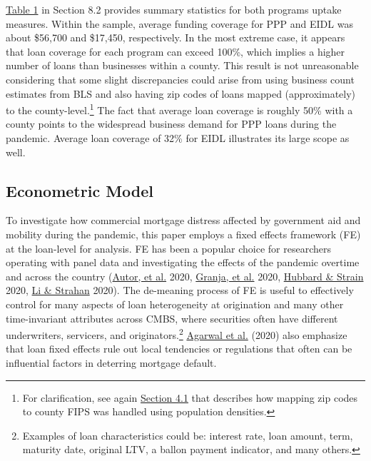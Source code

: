 \documentclass[11pt]{article} %
\begin{document}
\hyperlink{Summary Statistics}{Table 1} in Section 8.2 provides summary statistics for both programs uptake measures. Within the sample, average funding coverage for PPP and EIDL was about \$56,700 and \$17,450, respectively. In the most extreme case, it appears that loan coverage for each program can exceed 100\%, which implies a higher number of loans than businesses within a county. This result is not unreasonable considering that some slight discrepancies could arise from using business count estimates from BLS and also having zip codes of loans mapped (approximately) to the county-level.\footnote{For clarification, see again \hyperlink{Commercial Mortgage Performance}{Section 4.1} that describes how mapping zip codes to county FIPS was handled using population densities.} The fact that average loan coverage is roughly 50\% with a county points to the widespread business demand for PPP loans during the pandemic. Average loan coverage of 32\% for EIDL illustrates its large scope as well.  

\subsection{Econometric Model}
To investigate how commercial mortgage distress affected by government aid and mobility during the pandemic, this paper employs a fixed effects framework (FE) at the loan-level for analysis. FE has been a popular choice for researchers operating with panel data and investigating the effects of the pandemic overtime and across the country (\hyperlink{Autor}{Autor, et al.} 2020, \hyperlink{Granja}{Granja, et al.} 2020, \hyperlink{Hubbard}{Hubbard \& Strain} 2020, \hyperlink{Li}{Li \& Strahan} 2020). The de-meaning process of FE is useful to effectively control for many aspects of loan heterogeneity at origination and many other time-invariant attributes across CMBS, where securities often have different underwriters, servicers, and originators.\footnote{Examples of loan characteristics could be: interest rate, loan amount, term, maturity date, original LTV, a ballon payment indicator, and many others.} \hyperlink{Agarwal}{Agarwal et al.} (2020) also emphasize that loan fixed effects rule out local tendencies or regulations that often can be influential factors in deterring mortgage default.
\end{document}
